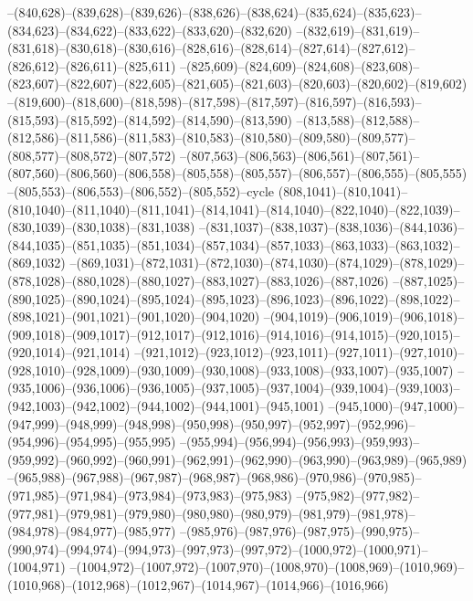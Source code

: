 --(840,628)--(839,628)--(839,626)--(838,626)--(838,624)--(835,624)--(835,623)--(834,623)--(834,622)--(833,622)--(833,620)--(832,620)
--(832,619)--(831,619)--(831,618)--(830,618)--(830,616)--(828,616)--(828,614)--(827,614)--(827,612)--(826,612)--(826,611)--(825,611)
--(825,609)--(824,609)--(824,608)--(823,608)--(823,607)--(822,607)--(822,605)--(821,605)--(821,603)--(820,603)--(820,602)--(819,602)
--(819,600)--(818,600)--(818,598)--(817,598)--(817,597)--(816,597)--(816,593)--(815,593)--(815,592)--(814,592)--(814,590)--(813,590)
--(813,588)--(812,588)--(812,586)--(811,586)--(811,583)--(810,583)--(810,580)--(809,580)--(809,577)--(808,577)--(808,572)--(807,572)
--(807,563)--(806,563)--(806,561)--(807,561)--(807,560)--(806,560)--(806,558)--(805,558)--(805,557)--(806,557)--(806,555)--(805,555)
--(805,553)--(806,553)--(806,552)--(805,552)--cycle
(808,1041)--(810,1041)--(810,1040)--(811,1040)--(811,1041)--(814,1041)--(814,1040)--(822,1040)--(822,1039)--(830,1039)--(830,1038)--(831,1038)
--(831,1037)--(838,1037)--(838,1036)--(844,1036)--(844,1035)--(851,1035)--(851,1034)--(857,1034)--(857,1033)--(863,1033)--(863,1032)--(869,1032)
--(869,1031)--(872,1031)--(872,1030)--(874,1030)--(874,1029)--(878,1029)--(878,1028)--(880,1028)--(880,1027)--(883,1027)--(883,1026)--(887,1026)
--(887,1025)--(890,1025)--(890,1024)--(895,1024)--(895,1023)--(896,1023)--(896,1022)--(898,1022)--(898,1021)--(901,1021)--(901,1020)--(904,1020)
--(904,1019)--(906,1019)--(906,1018)--(909,1018)--(909,1017)--(912,1017)--(912,1016)--(914,1016)--(914,1015)--(920,1015)--(920,1014)--(921,1014)
--(921,1012)--(923,1012)--(923,1011)--(927,1011)--(927,1010)--(928,1010)--(928,1009)--(930,1009)--(930,1008)--(933,1008)--(933,1007)--(935,1007)
--(935,1006)--(936,1006)--(936,1005)--(937,1005)--(937,1004)--(939,1004)--(939,1003)--(942,1003)--(942,1002)--(944,1002)--(944,1001)--(945,1001)
--(945,1000)--(947,1000)--(947,999)--(948,999)--(948,998)--(950,998)--(950,997)--(952,997)--(952,996)--(954,996)--(954,995)--(955,995)
--(955,994)--(956,994)--(956,993)--(959,993)--(959,992)--(960,992)--(960,991)--(962,991)--(962,990)--(963,990)--(963,989)--(965,989)
--(965,988)--(967,988)--(967,987)--(968,987)--(968,986)--(970,986)--(970,985)--(971,985)--(971,984)--(973,984)--(973,983)--(975,983)
--(975,982)--(977,982)--(977,981)--(979,981)--(979,980)--(980,980)--(980,979)--(981,979)--(981,978)--(984,978)--(984,977)--(985,977)
--(985,976)--(987,976)--(987,975)--(990,975)--(990,974)--(994,974)--(994,973)--(997,973)--(997,972)--(1000,972)--(1000,971)--(1004,971)
--(1004,972)--(1007,972)--(1007,970)--(1008,970)--(1008,969)--(1010,969)--(1010,968)--(1012,968)--(1012,967)--(1014,967)--(1014,966)--(1016,966)
